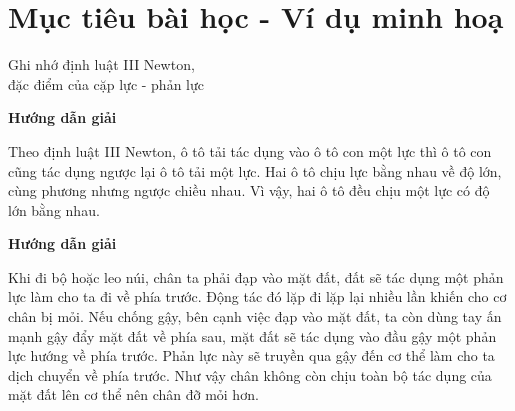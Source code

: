 \section{Mục tiêu bài học - Ví dụ minh hoạ}
\begin{dang}{Ghi nhớ định luật III Newton, \\đặc điểm của cặp lực - phản lực}
	{	\begin{center}
			\textbf{Hướng dẫn giải}
		\end{center}
		
		Theo định luật III Newton, ô tô tải tác dụng vào ô tô con một lực thì ô tô con cũng tác dụng ngược lại ô tô tải một lực. Hai ô tô chịu lực bằng nhau về độ lớn, cùng phương nhưng ngược chiều nhau. Vì vậy, hai ô tô đều chịu một lực có độ lớn bằng nhau.
		
	}
	{	\begin{center}
			\textbf{Hướng dẫn giải}
		\end{center}
		
		Khi đi bộ hoặc leo núi, chân ta phải đạp vào mặt đất, đất sẽ tác dụng một phản lực làm cho ta đi về phía trước. Động tác đó lặp đi lặp lại nhiều lần khiến cho cơ chân bị mỏi. Nếu chống gậy, bên cạnh việc đạp vào mặt đất, ta còn dùng tay ấn mạnh gậy đẩy mặt đất về phía sau, mặt đất sẽ tác dụng vào đầu gậy một phản lực hướng về phía trước. Phản lực này sẽ truyền qua gậy đến cơ thể làm cho ta dịch chuyển về phía trước. Như vậy chân không còn chịu toàn bộ tác dụng của mặt đất lên cơ thể nên chân đỡ mỏi hơn.
	}
\end{dang}

